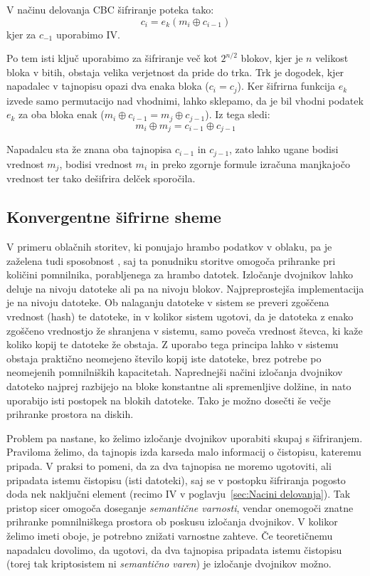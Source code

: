 \documentclass[12pt,a4paper,openany,tikz]{book}
\theoremstyle{plain}
\theoremstyle{definition}
\begin{document}
\begin{mdframed}[frametitle={Rojstnodnevni napad na način delovanja CBC}]
V načinu delovanja CBC šifriranje poteka tako: $$c_i = e_k(m_i \oplus c_{i-1})$$ kjer za $c_{-1}$ uporabimo \gls{IV}.

Po tem isti ključ uporabimo za šifriranje več kot $2^{n/2}$ blokov, kjer je $n$ velikost bloka v bitih, obstaja velika verjetnost da pride do trka. Trk je dogodek, kjer napadalec v tajnopisu opazi dva enaka bloka ($c_i = c_j$). Ker šifrirna funkcija $e_k$ izvede samo permutacijo nad vhodnimi, lahko sklepamo, da je bil vhodni podatek $e_k$ za oba bloka enak ($m_i \oplus c_{i-1} = m_j \oplus c_{j-1}$). Iz tega sledi: $$m_i \oplus m_j = c_{i-1} \oplus c_{j-1}$$

Napadalcu sta že znana oba tajnopisa $c_{i-1}$ in $c_{j-1}$, zato lahko ugane bodisi vrednost $m_j$, bodisi vrednost $m_i$ in preko zgornje formule izračuna manjkajočo vrednost ter tako dešifrira delček sporočila.
\end{mdframed}


\subsection{Konvergentne šifrirne sheme}
\label{sub:Konvergentne šifrirne sheme}

V primeru oblačnih storitev, ki ponujajo hrambo podatkov v oblaku, pa je zaželena tudi sposobnost , saj ta ponudniku storitve omogoča prihranke pri količini pomnilnika, porabljenega za hrambo datotek. Izločanje dvojnikov lahko deluje na nivoju datoteke ali pa na nivoju blokov. Najpreprostejša implementacija je na nivoju datoteke. Ob nalaganju datoteke v sistem se preveri zgoščena vrednost (hash) te datoteke, in v kolikor sistem ugotovi, da je datoteka z enako zgoščeno vrednostjo že shranjena v sistemu, samo poveča vrednost števca, ki kaže koliko kopij te datoteke že obstaja. Z uporabo tega principa lahko v sistemu obstaja praktično neomejeno število kopij iste datoteke, brez potrebe po neomejenih pomnilniških kapacitetah. Naprednejši načini izločanja dvojnikov datoteko najprej razbijejo na bloke konstantne ali spremenljive dolžine, in nato uporabijo isti postopek na blokih datoteke. Tako je možno dosečti še večje prihranke prostora na diskih.

Problem pa nastane, ko želimo izločanje dvojnikov uporabiti skupaj s šifriranjem. Praviloma želimo, da tajnopis izda karseda malo informacij o čistopisu, kateremu pripada. V praksi to pomeni, da za dva tajnopisa ne moremo ugotoviti, ali pripadata istemu čistopisu (isti datoteki), saj se v postopku šifriranja pogosto doda nek naključni element (recimo \gls{IV} v poglavju~\ref{sec:Nacini delovanja}). Tak pristop sicer omogoča doseganje \textit{semantične varnosti}, vendar onemogoči znatne prihranke pomnilniškega prostora ob poskusu izločanja dvojnikov. V kolikor želimo imeti oboje, je potrebno znižati varnostne zahteve. Če teoretičnemu napadalcu dovolimo, da ugotovi, da dva tajnopisa pripadata istemu čistopisu (torej tak kriptosistem ni \textit{semantično varen}) je izločanje dvojnikov možno.
\end{document}
